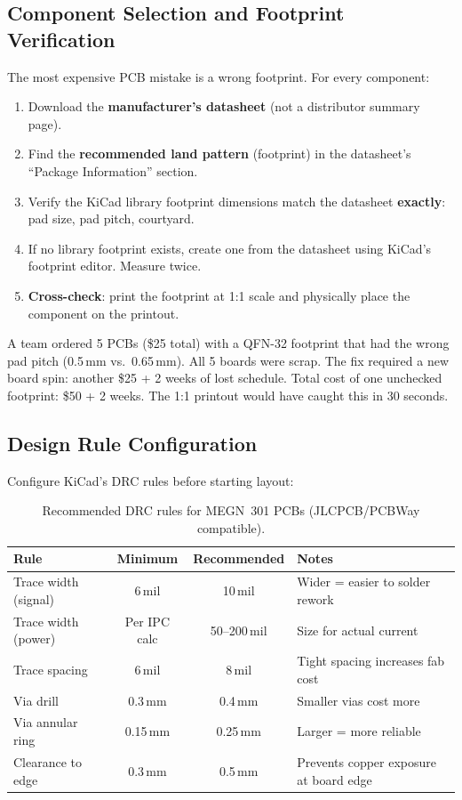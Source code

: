 \subsection{Component Selection and Footprint Verification}
The most expensive PCB mistake is a wrong footprint. For every component:
\begin{enumerate}[nosep,leftmargin=1.5em]
\item Download the \textbf{manufacturer's datasheet} (not a distributor summary page).
\item Find the \textbf{recommended land pattern} (footprint) in the datasheet's ``Package Information'' section.
\item Verify the KiCad library footprint dimensions match the datasheet \textbf{exactly}: pad size, pad pitch, courtyard.
\item If no library footprint exists, create one from the datasheet using KiCad's footprint editor. Measure twice.
\item \textbf{Cross-check}: print the footprint at 1:1 scale and physically place the component on the printout.
\end{enumerate}

\begin{warningbox}
A team ordered 5 PCBs (\$25 total) with a QFN-32 footprint that had the wrong pad pitch (0.5\,mm vs.\ 0.65\,mm). All 5 boards were scrap. The fix required a new board spin: another \$25 + 2 weeks of lost schedule. Total cost of one unchecked footprint: \$50 + 2 weeks. The 1:1 printout would have caught this in 30 seconds.
\end{warningbox}

\subsection{Design Rule Configuration}
Configure KiCad's DRC rules before starting layout:
\begin{table}[htbp]\centering\small
\begin{tabularx}{\textwidth}{l c c X}
\toprule
\textbf{Rule} & \textbf{Minimum} & \textbf{Recommended} & \textbf{Notes} \\
\midrule
Trace width (signal) & 6\,mil & 10\,mil & Wider = easier to solder rework \\
Trace width (power) & Per IPC calc & 50--200\,mil & Size for actual current \\
Trace spacing & 6\,mil & 8\,mil & Tight spacing increases fab cost \\
Via drill & 0.3\,mm & 0.4\,mm & Smaller vias cost more \\
Via annular ring & 0.15\,mm & 0.25\,mm & Larger = more reliable \\
Clearance to edge & 0.3\,mm & 0.5\,mm & Prevents copper exposure at board edge \\
\bottomrule
\end{tabularx}
\caption{Recommended DRC rules for MEGN~301 PCBs (JLCPCB/PCBWay compatible).}
\end{table}

